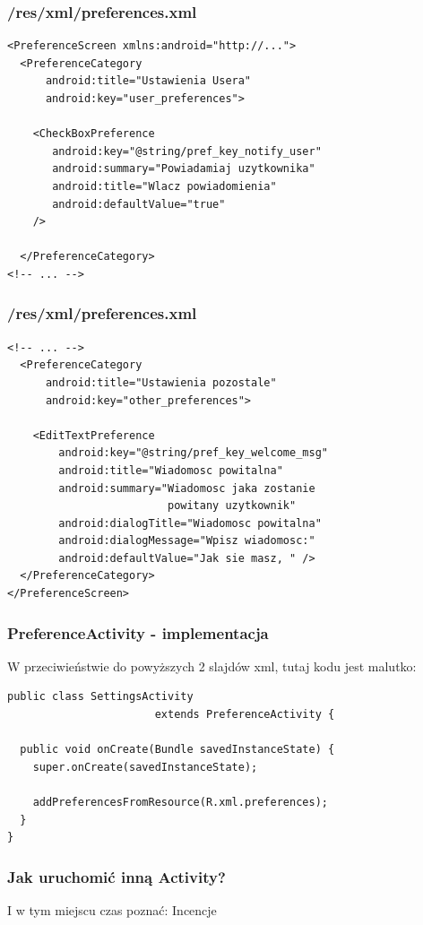 \begin{frame}[fragile]\frametitle{/res/\textbf{xml/preferences.xml}}
\begin{lstlisting} 
<PreferenceScreen xmlns:android="http://...">
  <PreferenceCategory 
      android:title="Ustawienia Usera"
      android:key="user_preferences">
       
    <CheckBoxPreference 
       android:key="@string/pref_key_notify_user"
       android:summary="Powiadamiaj uzytkownika"
       android:title="Wlacz powiadomienia" 
       android:defaultValue="true"
    />
            
  </PreferenceCategory>
<!-- ... -->
\end{lstlisting}
\end{frame}

\begin{frame}[fragile]\frametitle{/res/\textbf{xml/preferences.xml}}
\begin{lstlisting}
<!-- ... -->
  <PreferenceCategory 
      android:title="Ustawienia pozostale"
      android:key="other_preferences">

    <EditTextPreference
        android:key="@string/pref_key_welcome_msg"
        android:title="Wiadomosc powitalna" 
        android:summary="Wiadomosc jaka zostanie 
                         powitany uzytkownik"
        android:dialogTitle="Wiadomosc powitalna"
        android:dialogMessage="Wpisz wiadomosc:"    
        android:defaultValue="Jak sie masz, " />
  </PreferenceCategory>
</PreferenceScreen>
\end{lstlisting}
\end{frame}

\begin{frame}[fragile]\frametitle{PreferenceActivity - implementacja}
\begin{center}
W przeciwieństwie do powyższych 2 slajdów xml, tutaj kodu jest malutko:
\end{center}
\begin{lstlisting}
public class SettingsActivity 
                       extends PreferenceActivity {

  public void onCreate(Bundle savedInstanceState) {
    super.onCreate(savedInstanceState);

    addPreferencesFromResource(R.xml.preferences);
  }
}
\end{lstlisting}
\end{frame}

\begin{frame}\frametitle{Jak uruchomić inną Activity?}
\begin{center}
I w tym miejscu czas poznać:
\large{Incencje}
\end{center}
\end{frame}

